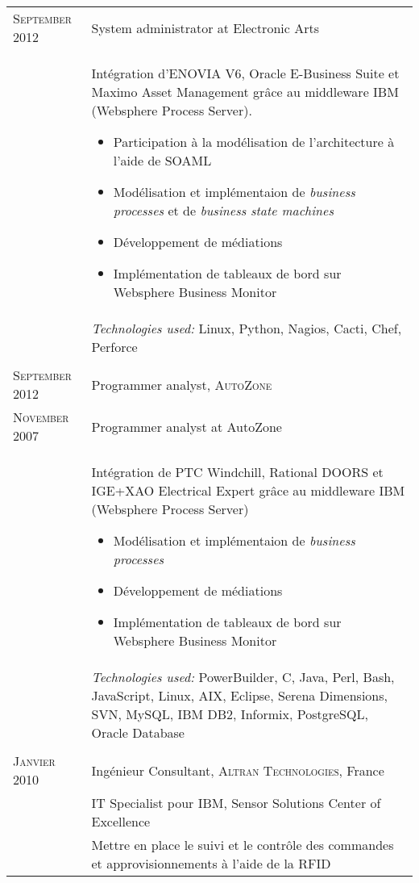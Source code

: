 \begin{longtable}{R{2.5cm}|p{14.8cm}}
 	\textsc{September 2012}&System administrator at Electronic Arts\\&
 	\footnotesize{
 		Intégration d'ENOVIA V6, Oracle E-Business Suite et Maximo Asset Management grâce au middleware IBM (Websphere Process Server).
 	 	\begin{itemize}
			\item Participation à la modélisation de l'architecture à l'aide de SOAML
			\item Modélisation et implémentaion de \emph{business processes} et de \emph{business state machines}
			\item Développement de médiations
			\item Implémentation de tableaux de bord sur Websphere Business Monitor
		\end{itemize}
		\vspace{-1em}
 	}\\&
 	\footnotesize{\emph{Technologies used:} Linux, Python, Nagios, Cacti, Chef, Perforce }\\
  \\
 	\textsc{September 2012} & Programmer analyst, \textsc{AutoZone}\\
 	\textsc{November 2007}&Programmer analyst at AutoZone\\&
 	\footnotesize{
 		Intégration de PTC Windchill, Rational DOORS et IGE+XAO Electrical Expert grâce au middleware IBM (Websphere Process Server)
 		\begin{itemize}
			\item Modélisation et implémentaion de \emph{business processes}
			\item Développement de médiations
			\item Implémentation de tableaux de bord sur Websphere Business Monitor
		\end{itemize}
		\vspace{-1em}
 	}\\&
 	\footnotesize{\emph{Technologies used:} PowerBuilder, C, Java, Perl, Bash, JavaScript, Linux, AIX, Eclipse, Serena Dimensions, SVN, MySQL, IBM DB2, Informix, PostgreSQL, Oracle Database }\\
  \\
 	\textsc{Janvier 2010} & Ingénieur Consultant, \textsc{Altran Technologies}, France\\
 	& IT Specialist pour IBM, Sensor Solutions Center of Excellence\\&
 	\footnotesize{
 	 	Mettre en place le suivi et le contrôle des commandes et approvisionnements à l'aide de la RFID
}
\end{longtable}
